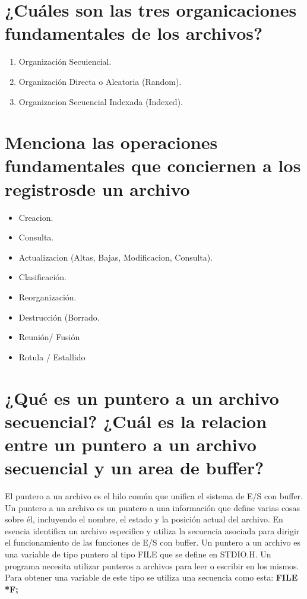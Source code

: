 \documentclass{article}
\begin{document}
\section{¿Cuáles son las tres organicaciones fundamentales de los archivos?}
    \begin{enumerate}
        \item Organización Secuiencial.
        \item Organización Directa o Aleatoria (Random).
        \item Organizacion Secuencial Indexada (Indexed).
    \end{enumerate}

\section{Menciona las operaciones fundamentales que conciernen a los registrosde un archivo}
    \begin{itemize}
        \item Creacion.
        \item Consulta.
        \item Actualizacion (Altas, Bajas, Modificacion, Consulta).
        \item Clasificación.
        \item Reorganización.
        \item Destrucción (Borrado.
        \item Reunión/ Fusión
        \item Rotula / Estallido
    \end{itemize}

\section{¿Qué es un puntero a un archivo secuencial? ¿Cuál es la relacion entre un puntero a un archivo secuencial y un area de buffer?}
    El puntero a un archivo es el hilo común que unifica el sistema de E/S con buffer. Un puntero a un archivo es
    un puntero a una información que define varias cosas sobre él, incluyendo el nombre, el estado y la posición actual
    del archivo. En esencia identifica un archivo especifico y utiliza la secuencia asociada para dirigir el funcionamiento
    de las funciones de E/S con buffer. Un puntero a un archivo es una variable de tipo puntero al tipo FILE que se
    define en STDIO.H. Un programa necesita utilizar punteros a archivos para leer o escribir en los mismos. Para
    obtener una variable de este tipo se utiliza una secuencia como esta: \textbf{FILE *F;}
\end{document}
